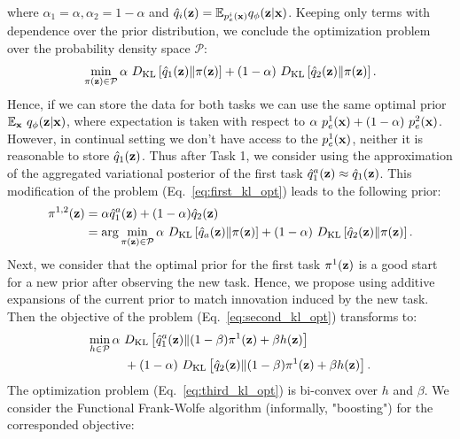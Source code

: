 where $\alpha_1=\alpha, \alpha_2=1-\alpha$ and $\hat{q}_{i}({\mathbf{z}})=\mathbb{E}_{p^{i}_{e}({\mathbf{x}})}q_{\phi}({\mathbf{z}}|{\mathbf{x}})$. 
Keeping only terms with dependence over the prior distribution, we conclude the optimization problem over the probability density space $\mathcal{P}$:
\begin{equation}
\label{eq:first_kl_opt}
\min\limits_{\pi(\rvz)\in\mathcal{P}}\alpha~\KL{\hat{q}_{1}(\rvz)}{\pi(\rvz)}  + (1-\alpha)~\KL{\hat{q}_{2}(\rvz)}{\pi(\rvz)}.
\end{equation}
Hence, if we can store the data for both tasks we can use the same optimal prior $\mathbb{E}_{{\mathbf{x}}}~q_{\phi}({\mathbf{z}}|{\mathbf{x}})$, where expectation is taken with respect to $\alpha~p^1_{e}({\mathbf{x}})+(1-\alpha)~ p^2_{e}({\mathbf{x}})$. However, in continual setting we don't have access to the $p_{e}^{1}({\mathbf{x}})$, neither it is reasonable to store $\hat{q}_{1}({\mathbf{z}})$. Thus after Task 1, we consider using the approximation of the aggregated variational posterior of the first task $\hat{q}_{1}^{a}({\mathbf{z}})\approx\hat{q}_{1}({\mathbf{z}})$. This modification of the problem (Eq.~\ref{eq:first_kl_opt}) leads to the following prior:
\begin{equation}
\label{eq:second_kl_opt}
\begin{aligned}
\pi^{1,2}(\rvz) &= \alpha \hat{q}_{1}^{a}(\rvz) + (1-\alpha) \hat{q}_{2}(\rvz) \\
&= \arg\min\limits_{\pi(\rvz)\in\mathcal{P}}\alpha~\KL{\hat{q}_{a}(\rvz)}{\pi(\rvz)}  + (1-\alpha)~\KL{\hat{q}_{2}(\rvz)}{\pi(\rvz)}.
\end{aligned}
\end{equation}
Next, we consider that the optimal prior for the first task $\pi^{1}({\mathbf{z}})$ is a good start for a new prior after observing the new task. Hence, we propose using additive expansions of the current prior to match innovation induced by the new task. Then the objective of the problem (Eq.~\ref{eq:second_kl_opt}) transforms to:
\begin{equation}
\label{eq:third_kl_opt}
\begin{aligned}
\min\limits_{h\in\mathcal{P}}  \alpha~&\KL{\hat{q}_{1}^{a}(\rvz)}{(1-\beta)\pi^{1}(\rvz)+\beta h(\rvz)} \\
 & + (1-\alpha)~\KL{\hat{q}_{2}(\rvz)}{(1-\beta)\pi^{1}(\rvz)+\beta h(\rvz)}.
\end{aligned}
\end{equation}
The optimization problem (Eq.~\ref{eq:third_kl_opt}) is bi-convex over $h$ and $\beta$. We consider the Functional Frank-Wolfe algorithm (informally, "boosting") \citep{wang2015functional} for the corresponded objective:
